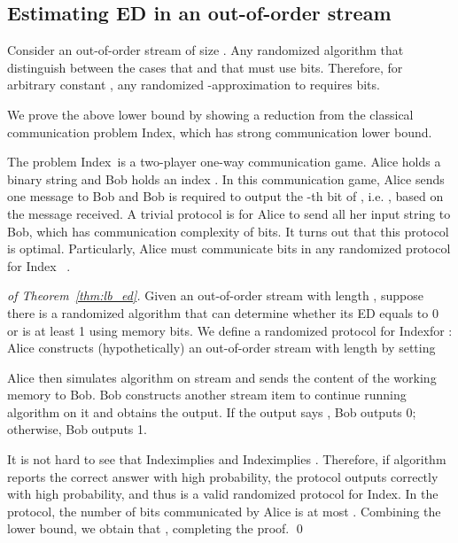 \documentclass{llncs}
\newcommand{\ind}{{\sc Index}}
\begin{document}
\subsection{Estimating ED in an out-of-order stream}


\begin{theorem}\label{thm:lb_ed}
  Consider an out-of-order stream  of size .
  Any randomized algorithm that distinguish between the cases that 
   and that  must use  bits.
  Therefore, for arbitrary constant , any randomized -approximation to
   requires  bits.
\end{theorem}

We prove the above lower bound by showing a reduction from the classical
communication problem \ind, which has strong communication lower bound. 

The problem \ind~is a two-player one-way communication game.  Alice holds a binary
string  and Bob holds an index .
In this communication game, Alice sends one message to Bob and Bob is
required to output the -th bit of , i.e.  , based on 
the message received.  A trivial protocol is for Alice to send all her
input string  to Bob, which has communication complexity of  bits.  It turns
out that this protocol is optimal.  Particularly, Alice must
communicate  bits in any randomized protocol for \ind
~\cite{Abl96}.

\begin{proof}[of Theorem~\ref{thm:lb_ed}]
  Given an out-of-order stream with length , suppose there is a
  randomized algorithm  that can determine whether its ED equals to
  0 or is at least 1 using  memory bits.  We define a randomized
  protocol  for \ind for : Alice constructs
  (hypothetically) an out-of-order stream  with length  by setting
  
  Alice then simulates algorithm  on stream  and sends the
  content of the working memory to Bob.  Bob constructs another stream item
   to continue running algorithm
   on it and obtains the output.  If the output says , Bob outputs 0; otherwise, Bob outputs 1.

  It is not hard to see that \ind implies  and
  \ind implies .  Therefore, if algorithm
   reports the correct answer with high probability, the protocol
   outputs correctly with high probability, and thus is a valid
  randomized protocol for \ind.  In the protocol, the number of bits communicated by Alice is
  at most .  Combining the  lower bound, we obtain
  that , completing the proof.
\hfill\qed
\end{proof}
\end{document}

